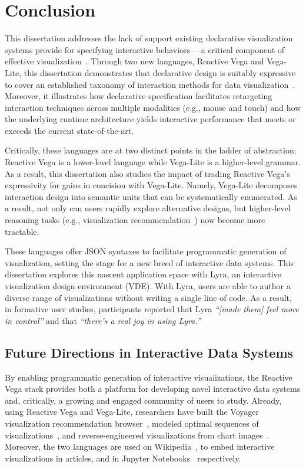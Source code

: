 \chapter{Conclusion}
\label{sec:conclusion}

This dissertation addresses the lack of support existing declarative
visualization systems provide for specifying interactive behaviors\,---\,a
critical component of effective
visualization~\cite{pike:interactionscience,yi:understanding}. Through two new
languages, Reactive Vega and Vega-Lite, this dissertation demonstrates that
declarative design is suitably expressive to cover an established taxonomy of
interaction methods for data visualization~\cite{yi:understanding}. Moreover, it
illustrates how declarative specification facilitates retargeting interaction
techniques across multiple modalities (e.g., mouse and touch) and how the
underlying runtime architecture yields interactive performance that meets or
exceeds the current state-of-the-art.

Critically, these languages are at two distinct points in the ladder of
abstraction: Reactive Vega is a lower-level language while Vega-Lite is a
higher-level grammar. As a result, this dissertation also studies the impact of
trading Reactive Vega's expressivity for gains in concision with Vega-Lite.
Namely, Vega-Lite decomposes interaction design into semantic units that can be
systematically enumerated. As a result, not only can users rapidly explore
alternative designs, but higher-level reasoning tasks (e.g., visualization
recommendation~\cite{compassql}) now become more tractable.

These languages offer JSON syntaxes to facilitate programmatic generation of
visualization, setting the stage for a new breed of interactive data systems.
This dissertation explores this nascent application space with Lyra, an
interactive visualization design environment (VDE). With Lyra, users are able to
author a diverse range of visualizations without writing a single line of code.
As a result, in formative user studies, participants reported that Lyra
\emph{``[made them] feel more in control''} and that \emph{``there's a real joy
in using Lyra.''}

\section{Future Directions in Interactive Data Systems}

By enabling programmatic generation of interactive visualizations, the Reactive
Vega stack provides both a platform for developing novel interactive data
systems and, critically, a growing and engaged community of users to study.
Already, using Reactive Vega and Vega-Lite, researchers have built the Voyager
visualization recommendation browser~\cite{voyager,voyager2,compassql}, modeled
optimal sequences of visualizations~\cite{kim:graphscape}, and
reverse-engineered visualizations from chart images~\cite{poco:reverse}.
Moreover, the two languages are used on Wikipedia~\cite{mediawiki:graph}, to
embed interactive visualizations in articles, and in Jupyter
Notebooks~\cite{vega-lite:altair} respectively.

